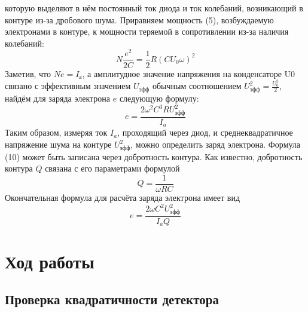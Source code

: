 \documentclass[a4paper, 12pt]{article}%
\begin{document}
 	которую выделяют в нём постоянный ток диода
 	и ток
 	колебаний,
 	возникающий в контуре из-за дробового шума.
 	Приравняем мощность (5), возбуждаемую электронами в контуре,
 	к мощности теряемой в сопротивлении из-за наличия
 	колебаний:
	 \begin{equation}
	 N \frac{e^2}{2C} = \frac{1}{2}R (CU_0\omega)^2
	 \end{equation}
 	Заметив, что
 	$Ne =
 	I_а$, а амплитудное значение напряжения на
 	конденсаторе
 	U0 связано с эффективным значением
 	$U_{эфф}$ обычным соотношением
 	$U^2_{эфф}
 	= \frac{U_0^2}{2}$, найдём для заряда электрона $e$ следующую формулу:
 	\begin{equation}
 		e = \frac{2 \omega^2C^3RU_{эфф}^2}{I_a}
 	\end{equation}
	 Таким образом, измеряя ток
	 $I_a$, проходящий через диод,
	 и среднеквадратичное напряжение шума на
	 контуре
	 $U^2_{эфф}$, можно определить заряд
	 электрона. Формула (10) может быть записана через добротность
	 контура. Как известно, добротность контура
	 $Q$ связана с его параметрами
	 формулой
	 \begin{equation}
	 Q = \frac{1}{\omega RC}
	 \end{equation}
	 Окончательная формула для расчёта заряда электрона имеет вид
	 \begin{equation}
	 	e = \frac{2 \omega C^2U_{эфф}^2}{I_a Q}
	 \end{equation}
 	\newpage
	\section{Ход работы}
	\subsection{Проверка квадратичности детектора}
\end{document}
